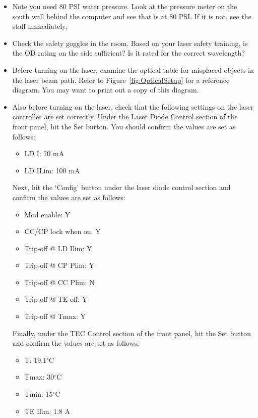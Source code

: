 \documentclass{../lab}
\begin{document}
\begin{itemize}
    \item Note you need 80 PSI water pressure. Look at the pressure meter on the south wall behind the computer and see that is at 80 PSI.  If it is not, see the staff immediately.

    \item Check the safety goggles in the room. Based on your laser safety training, is the OD rating on the side sufficient? Is it rated for the correct wavelength?
    

    \item Before turning on the laser, examine the optical table for misplaced objects in the laser beam path. Refer to Figure~\ref{fig:OpticalSetup} for a reference diagram. You may want to print out a copy of this diagram. 

    \item Also before turning on the laser, check that the following settings on the laser controller are set correctly. Under the Laser Diode Control section of the front panel, hit the Set button. You should confirm the values are set as follows:
    \begin{itemize}
        \item LD I: 70 mA
        \item LD ILim: 100 mA
    \end{itemize}
    Next, hit the `Config' button under the laser diode control section and confirm the values are set as follows:
    \begin{itemize}
        \item Mod enable: Y
        \item CC/CP lock when on: Y
        \item Trip-off @ LD Ilim: Y
        \item Trip-off @ CP Plim: Y
        \item Trip-off @ CC Plim: N
        \item Trip-off @ TE off: Y
        \item Trip-off @ Tmax: Y
    \end{itemize}
    Finally, under the TEC Control section of the front panel, hit the Set button and confirm the values are set as follows:
    \begin{itemize}
        \item T: 19.1$^\circ$C
        \item Tmax: 30$^\circ$C
        \item Tmin: 15$^\circ$C
        \item TE Ilim: 1.8 A
    \end{itemize}
    

\end{itemize}
\end{document}
